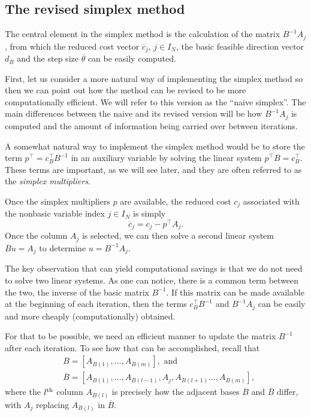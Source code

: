 \subsection{The revised simplex method}

The central element in the simplex method is the calculation of the matrix $B^{-1}A_j$, from which the reduced cost vector $\overline{c}_j$, $j \in I_N$, the basic feasible direction vector $d_B$ and the step size $\overline{\theta}$ can be easily computed.

First, let us consider a more natural way of implementing the simplex method so then we can point out how the method can be revised to be more computationally efficient. We will refer to this version as the ``naive simplex''. The main differences between the naive and its revised version will be how $B^{-1}A_j$ is computed and the amount of information being carried over between iterations.

A somewhat natural way to implement the simplex method would be to store the term $p^\top = c_B^\top B^{-1}$ in an auxiliary variable by solving the linear system $p^\top B = c_B^\top$. These terms are important, as we will see later, and they are often referred to as the \emph{simplex multipliers}.

Once the simplex multipliers $p$ are available, the reduced cost $c_j$ associated with the nonbasic variable index $j \in I_N$ is simply 
%
\begin{equation*}
	\overline{c}_j = c_j - p^\top A_j.	
\end{equation*}
%
Once the column $A_j$ is selected, we can then solve a second linear system $Bu = A_j$ to determine $u = B^{-1}A_j$. 

The key observation that can yield computational savings is that we do not need to solve two linear systems. As one can notice, there is a common term between the two, the inverse of the basic matrix $B^{-1}$. If this matrix can be made available at the beginning of each iteration, then the terms $c_B^\top B^{-1}$ and $B^{-1}A_j$ can be easily and more cheaply (computationally) obtained.

For that to be possible, we need an efficient manner to update the matrix $B^{-1}$ after each iteration. To see how that can be accomplished, recall that
%
\begin{align*}
	& B = [A_{B(1)}, \dots, A_{B(m)}], \text{ and } \\ 
	& \overline{B} = [A_{B(1)}, \dots, A_{B(l-1)},A_j,A_{B(l+1)}\dots, A_{B(m)}], 
\end{align*}
%
where the $l^\text{th}$ column $A_{B(l)}$ is precisely how the adjacent bases $B$ and $\overline{B}$ differ, with $A_j$ replacing $A_{B(l)}$ in $\overline{B}$.

